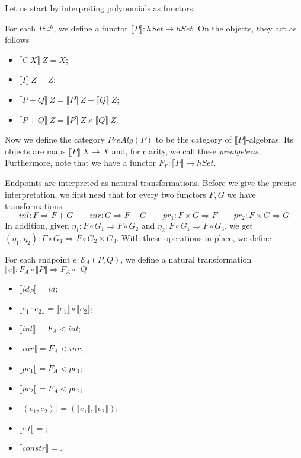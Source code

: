 \documentclass[9pt]{entcs}
\newcommand{\type}[1]{#1}
\newcommand{\constructor}[1]{#1}
\newcommand{\category}[1]{#1}
\newcommand{\nattranstxt}[1]{#1}
\newcommand{\hset}{\type{hSet}} %
\newcommand{\1}{\type{1}} %
\newcommand{\functor}[2]{#1 \rightarrow #2} %
\newcommand{\compf}[2]{#1 \circ #2} %
\newcommand{\prodf}[2]{#1 \times #2} %
\newcommand{\sumf}[2]{#1 + #2} %
\newcommand{\nattrans}[2]{#1 \Rightarrow #2} %
\newcommand{\idt}[1]{\nattranstxt{id}} %
\newcommand{\compt}[2]{#1 \circ #2} %
\newcommand{\lwhisker}[2]{#1 \vartriangleleft #2} %
\newcommand{\inlt}{\nattranstxt{inl}} %
\newcommand{\inrt}{\nattranstxt{inr}} %
\newcommand{\prlt}{\nattranstxt{pr}_1} %
\newcommand{\prrt}{\nattranstxt{pr}_2} %
\newcommand{\pairt}[2]{(#1 , #2)} %
\newcommand{\poly}{\mathcal{P}} %
\newcommand{\C}{\constructor{C}} %
\newcommand{\I}{\constructor{I}} %
\newcommand{\sumP}[2]{#1 + #2} %
\newcommand{\ep}[3]{\mathcal{E}_{#1}(#2,#3)} %
\newcommand{\id}[1]{\constructor{id}_{#1}} %
\newcommand{\comp}[2]{#1 \cdot #2} %
\newcommand{\inle}{\constructor{inl}} %
\newcommand{\inre}{\constructor{inr}} %
\newcommand{\prle}{\constructor{pr}_1} %
\newcommand{\prre}{\constructor{pr}_2} %
\newcommand{\pair}[2]{(#1 , #2)} %
\newcommand{\Ce}{\constructor{c}} %
\newcommand{\constr}{\constructor{constr}} %
\newcommand{\semP}[1]{\llbracket #1 \rrbracket} %
\newcommand{\prealg}[1]{\category{PreAlg}(#1)} %
\newcommand{\forget}[1]{F_{#1}} %
\newcommand{\semE}[1]{\llbracket #1 \rrbracket} %
\begin{document}
Let us start by interpreting polynomials as functors.

\begin{definition}
For each $P : \poly$, we define a functor $\semP{P} : \functor{\hset}{\hset}$. On the objects, they act as follows
\begin{itemize}
	\item $\semP{\C \> X} \> Z = X$;
	\item $\semP{\I} \> Z = Z$;
	\item $\semP{\sumP{P}{Q}} \> Z = \semP{P} \> Z + \semP{Q} \> Z$;
	\item $\semP{\sumP{P}{Q}} \> Z = \semP{P} \> Z \times \semP{Q} \> Z$.
\end{itemize}
\end{definition}

Now we define the category $\prealg{P}$ to be the category of $\semP{P}$-algebras.
Its objects are maps $\semP{P} \> X \rightarrow X$ and, for clarity, we call these \emph{prealgebras}.
Furthermore, note that we have a functor $\forget{P} : \functor{\semP{P}}{\hset}$.

Endpoints are interpreted as natural transformations.
Before we give the precise interpretation, we first need that for every two functors $F, G$ we have transformations
\[
\inlt : \nattrans{F}{\sumf{F}{G}}
\quad \quad
\inrt : \nattrans{G}{\sumf{F}{G}}
\quad \quad
\prlt : \nattrans{\prodf{F}{G}}{F}
\quad \quad
\prrt : \nattrans{\prodf{F}{G}}{G}
\]
In addition, given $\eta_1 : \nattrans{\compf{F}{G_1}}{\compf{F}{G_2}}$ and $\eta_2 : \nattrans{\compf{F}{G_1}}{\compf{F}{G_3}}$, we get $\pairt{\eta_1}{\eta_2} : \nattrans{\compf{F}{G_1}}{\compf{F}{\prodf{G_2}{G_3}}}$.
With these operations in place, we define

\begin{definition}
For each endpoint $e : \ep{A}{P}{Q}$, we define a natural transformation $\semE{e} : \nattrans{\compf{\forget{A}}{\semP{P}}} {\compf{\forget{A}}{\semP{Q}}}$
\begin{itemize}
	\item $\semE{\id{P}} = \idt{\compf{\forget{A}}{\semP{P}}}$;
	\item $\semE{\comp{e_1}{e_2}} = \compt{\semE{e_1}}{\semE{e_2}}$;
	\item $\semE{\inle} = \lwhisker{\forget{A}}{\inlt}$;
	\item $\semE{\inre} = \lwhisker{\forget{A}}{\inrt}$;
	\item $\semE{\prle} = \lwhisker{\forget{A}}{\prlt}$;
	\item $\semE{\prre} = \lwhisker{\forget{A}}{\prrt}$;
	\item $\semE{\pair{e_1}{e_2}} = \pairt{\semE{e_1}}{\semE{e_2}}$;
	\item $\semE{\Ce \> t} = $;
	\item $\semE{\constr} = $.
\end{itemize}
\end{definition}
\end{document}
